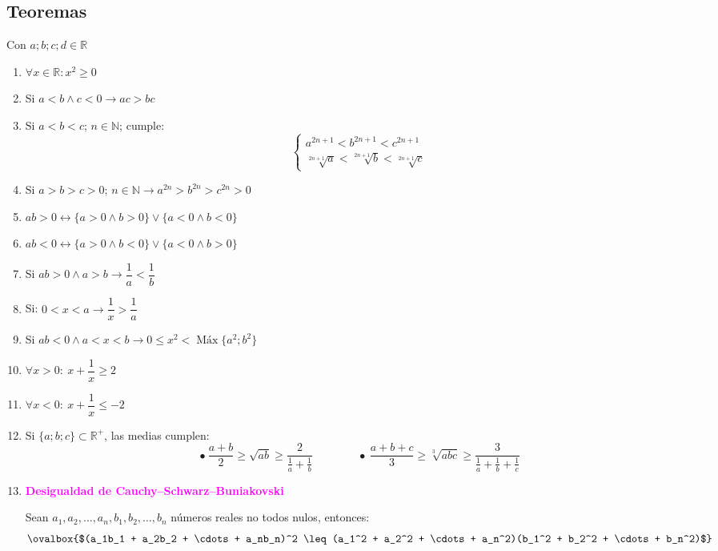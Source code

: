 \documentclass[11pt,a4paper]{article}
\newcommand{\cn}[1]{\raisebox{.5pt}{\textcircled{\raisebox{-.9pt}{\scriptsize #1}}}}
\begin{document}
\subsection*{Teoremas}
Con $a; b; c; d \in \mathbb{R}$

\begin{minipage}[t]{0.485\textwidth}
\begin{enumerate}[label=\cn{\arabic*}]
  \item $\forall x \in \mathbb{R}: x^2 \geq 0$
  \item Si $a < b \wedge c < 0 \rightarrow ac > bc$
  \item Si $a < b < c$; $n \in \mathbb{N}$; cumple:
  \[
  \begin{cases}
  a^{2n+1} < b^{2n+1} < c^{2n+1}\\[4pt]
  \sqrt[2n+1]{a} < \sqrt[2n+1]{b} < \sqrt[2n+1]{c}
  \end{cases}
  \]
\end{enumerate}
\end{minipage}\hfill
\begin{minipage}[t]{0.485\textwidth}
\begin{enumerate}[label=\cn{\arabic*}]\setcounter{enumi}{3}
  \item Si $a > b > c > 0$; $n \in \mathbb{N} \rightarrow a^{2n} > b^{2n} > c^{2n} > 0$
  \item $ab > 0 \leftrightarrow \{a > 0 \wedge b > 0\} \vee \{a < 0 \wedge b < 0\}$
  \item $ab < 0 \leftrightarrow \{a > 0 \wedge b < 0\} \vee \{a < 0 \wedge b > 0\}$
  \item Si $ab > 0 \wedge a > b \rightarrow \dfrac{1}{a} < \dfrac{1}{b}$
  \item Si: $0 < x < a \rightarrow \dfrac{1}{x} > \dfrac{1}{a}$
\end{enumerate}
\end{minipage}

\begin{enumerate}[label=\cn{\arabic*}]\setcounter{enumi}{8}
  \item Si $ab < 0 \wedge a < x < b \rightarrow 0 \leq x^2 < \operatorname{Máx}\{a^2; b^2\}$
  \item $\forall x > 0:\ x + \dfrac{1}{x} \geq 2$
  \item $\forall x < 0:\ x + \dfrac{1}{x} \leq -2$
  \item Si $\{a; b; c\} \subset \mathbb{R}^+$, las medias cumplen:
  \[
  \bullet\ \frac{a+b}{2} \geq \sqrt{ab} \geq \frac{2}{\frac{1}{a} + \frac{1}{b}}
  \qquad\qquad
  \bullet\ \frac{a+b+c}{3} \geq \sqrt[3]{abc} \geq \frac{3}{\frac{1}{a} + \frac{1}{b} + \frac{1}{c}}
  \]
  \item \textcolor{magenta}{\textbf{Desigualdad de Cauchy--Schwarz--Buniakovski}}

  Sean $a_1, a_2, \ldots, a_n, b_1, b_2, \ldots, b_n$ números reales no todos nulos, entonces:
  \[\ovalbox{$(a_1b_1 + a_2b_2 + \cdots + a_nb_n)^2 \leq (a_1^2 + a_2^2 + \cdots + a_n^2)(b_1^2 + b_2^2 + \cdots + b_n^2)$}\]
\end{enumerate}
\end{document}

